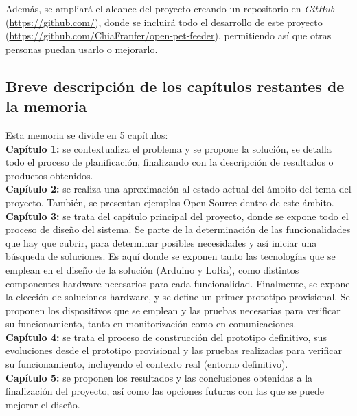 \documentclass[12pt]{article}
\begin{document}
	\noindent Además, se ampliará el alcance del proyecto creando un repositorio en \textit{GitHub }(\url{https://github.com/}), donde se incluirá todo el desarrollo de este proyecto (\url{https://github.com/ChiaFranfer/open-pet-feeder}), permitiendo así que otras personas puedan usarlo o mejorarlo.
	
	\subsection[Breve descripción de los capítulos restantes de la memoria]{Breve descripción de los capítulos restantes de la memoria}
	
	\noindent Esta memoria se divide en 5 capítulos:
\\
	
	\noindent \textbf{Capítulo 1: }se contextualiza el problema y se propone la solución, se detalla todo el
proceso de planificación, finalizando con
la descripción de resultados o productos obtenidos.\\
	
	\noindent \textbf{Capítulo 2: }se realiza una aproximación al estado actual del ámbito del tema del
proyecto. También, se presentan ejemplos Open Source dentro de este ámbito.
\\
	
	\noindent \textbf{Capítulo 3:} se trata del capítulo principal del proyecto, donde se expone todo el proceso de diseño del sistema. Se parte de la determinación de las funcionalidades que hay que cubrir, para determinar posibles necesidades y así iniciar una búsqueda de soluciones. Es aquí donde se exponen tanto las tecnologías que se emplean en el diseño de la solución (Arduino y LoRa), como distintos componentes hardware necesarios para cada funcionalidad. Finalmente, se expone la elección de soluciones hardware, y se define un primer prototipo provisional. Se proponen los dispositivos que se emplean y las pruebas necesarias para verificar su funcionamiento, tanto en monitorización como en comunicaciones. \\
	
	\noindent \textbf{Capítulo 4: }se trata el proceso de construcción del prototipo definitivo, sus evoluciones desde el prototipo provisional y las
pruebas realizadas para verificar su funcionamiento, incluyendo el contexto real (entorno definitivo).
\\
	
	\noindent \textbf{Capítulo 5:} se proponen los resultados y las conclusiones obtenidas a la finalización del proyecto, así como las opciones futuras con las que se puede mejorar el diseño.\\
\end{document}
